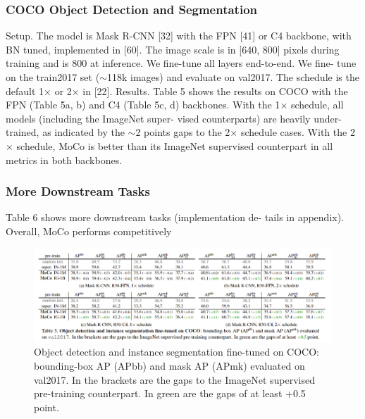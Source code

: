 \documentclass[10pt,twocolumn]{article}  %
\begin{document}
\subsubsection{COCO Object Detection and Segmentation}
Setup. The model is Mask R-CNN [32] with the FPN [41]
or C4 backbone, with BN tuned, implemented in [60]. The
image scale is in [640, 800] pixels during training and is 800
at inference. We ﬁne-tune all layers end-to-end. We ﬁne-
tune on the train2017 set ($\sim $118k images) and evaluate
on val2017. The schedule is the default 1$\times $ or 2$\times $ in [22].
Results. Table 5 shows the results on COCO with the FPN
(Table 5a, b) and C4 (Table 5c, d) backbones. With the
1$\times $ schedule, all models (including the ImageNet super-
vised counterparts) are heavily under-trained, as indicated
by the $\sim $2 points gaps to the 2$\times $ schedule cases. With the
2$\times $ schedule, MoCo is better than its ImageNet supervised
counterpart in all metrics in both backbones.

\subsubsection{More Downstream Tasks}
Table 6 shows more downstream tasks (implementation de-
tails in appendix). Overall, MoCo performs competitively


\begin{figure}[htbp]
    \centering
    \includegraphics[width=0.8\linewidth]{Pic/table5.png} %
    \caption{Object detection and instance segmentation ﬁne-tuned on COCO: bounding-box AP (APbb) and mask AP (APmk) evaluated
    on val2017. In the brackets are the gaps to the ImageNet supervised pre-training counterpart. In green are the gaps of at least +0.5 point.} %
    \label{fig:Table 5} %
\end{figure}
\end{document}
